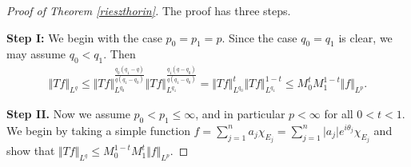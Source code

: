 \documentclass{article}
\numberwithin{equation}{section}
\theoremstyle{plain}
\theoremstyle{definition}
\begin{document}
\begin{proof}[Proof of Theorem \ref{rieszthorin}] The proof has three steps.
\item\textbf{Step I:} We begin with the case $p_0=p_1=p$. Since the case $q_0=q_1$ is clear, we may assume $q_0<q_1$. Then
\begin{align*}
	\Vert Tf\Vert_{L^q}\leq\Vert Tf\Vert_{L^{q_0}}^{\frac{q_0(q_1-q)}{q(q_1-q_0)}}\Vert Tf\Vert_{L^{q_1}}^{\frac{q_1(q-q_0)}{q(q_1-q_0)}}=\Vert Tf\Vert_{L^{q_0}}^{t}\Vert Tf\Vert_{L^{q_1}}^{1-t}\leq M_0^tM_1^{1-t}\Vert f\Vert_{L^p}.
\end{align*}

\item\textbf{Step II.} Now we assume $p_0<p_1\leq\infty$, and in particular $p<\infty$ for all $0<t<1$. We begin by taking a simple function $f=\sum_{j=1}^n a_j\chi_{E_j}=\sum_{j=1}^n\vert a_j\vert e^{i\theta_j}\chi_{E_j}$ and show that $\Vert Tf\Vert_{L^q}\leq M_0^{1-t}M_1^{t}\Vert f\Vert_{L^p}$. 


\end{proof}
\end{document}
